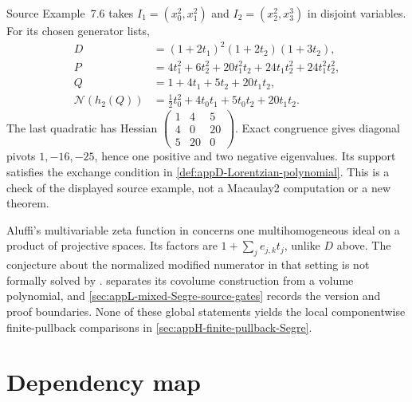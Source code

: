 Source Example~7.6 takes
$I_1=(x_0^2,x_1^2)$ and $I_2=(x_2^2,x_3^3)$ in disjoint
variables. For its chosen generator lists,
\[
\begin{aligned}
 D&=(1+2t_1)^2(1+2t_2)(1+3t_2),\\
 P&=4t_1^2+6t_2^2+20t_1^2t_2
                          +24t_1t_2^2+24t_1^2t_2^2,\\
 Q&=1+4t_1+5t_2+20t_1t_2,\\
 \mathcal N(h_2(Q))
   &=\tfrac12t_0^2+4t_0t_1+5t_0t_2+20t_1t_2.
\end{aligned}
\tag{C.42}\label{eq:appC-mixed-zeta-example}
\]
The last quadratic has Hessian
$\left(\begin{smallmatrix}1&4&5\\4&0&20\\5&20&0\end{smallmatrix}\right)$.
Exact congruence gives diagonal pivots $1,-16,-25$, hence one
positive and two negative eigenvalues. Its support satisfies
the exchange condition in \cref{def:appD-Lorentzian-polynomial}.
This is a check of the displayed source example, not a
Macaulay2 computation or a new theorem.

Aluffi's multivariable zeta function in
\cite{Aluffi23CovolumeV4} concerns one multihomogeneous ideal
on a product of projective spaces. Its factors are
$1+\sum_j e_{j,k}t_j$, unlike $D$ above. The conjecture about
the normalized modified numerator in that setting is not
formally solved by .
 separates its covolume
construction from a volume polynomial, and
\cref{sec:appL-mixed-Segre-source-gates} records the version
and proof boundaries. None of these global statements yields
the local componentwise finite-pullback comparisons in
\cref{sec:appH-finite-pullback-Segre}.

\section{Dependency map}
\label{sec:appC-dependency-map}

